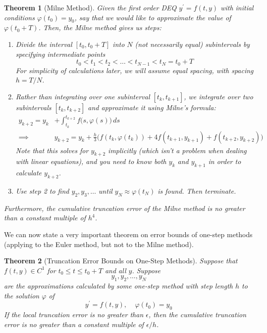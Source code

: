 \documentclass{article}
\newtheorem{theorem}{Theorem}[section]
\theoremstyle{remark}
\theoremstyle{definition}
\begin{document}
\begin{theorem}[Milne Method]
Given the first order DEQ $y^\prime = f(t, y)$ with initial conditions $\varphi(t_0) = y_0$, say that we would like to approximate the value of $\varphi(t_0 + T)$. Then, the \textit{Milne method} gives us steps: 
\begin{enumerate}
    \item Divide the interval $[t_0, t_0 + T]$ into $N$ (not necessarily equal) subintervals by specifying intermediate points 
    \[t_0 < t_1 < t_2 < \ldots < t_{N-1} < t_N = t_0 + T\]
    For simplicity of calculations later, we will assume equal spacing, with spacing $h = T/N$. 
    \item Rather than integrating over one subinterval $[t_k, t_{k+1}]$, we integrate over two subintervals $[t_k, t_{k+2}]$ and approximate it using Milne's formula:
    \begin{align*}
        y_{k+2} = y_k & + \int_{t_k}^{t_{k+2}} f\big(s, \varphi(s)\big)\,ds \\
        \implies & y_{k+2} = y_k + \frac{h}{3} \big( f(t_k, \varphi(t_k)) + 4 f (t_{k+1}, y_{k+1}) + f(t_{k+2}, y_{k+2})\big)
    \end{align*}
    Note that this solves for $y_{k+2}$ implicitly (which isn't a problem when dealing with linear equations), and you need to know both $y_k$ and $y_{k+1}$ in order to calculate $y_{k+2}$. 
    \item Use step 2 to find $y_2, y_3, \ldots$ until $y_N \approx \varphi(t_N)$ is found. Then terminate. 
\end{enumerate}
Furthermore, the cumulative truncation error of the Milne method is no greater than a constant multiple of $h^4$. 
\end{theorem}

We can now state a very important theorem on error bounds of one-step methods (applying to the Euler method, but not to the Milne method). 

\begin{theorem}[Truncation Error Bounds on One-Step Methods]
Suppose that $f(t, y) \in C^1$ for $t_0 \leq t \leq t_0 + T$ and all $y$. Suppose 
\[y_1, y_2, \ldots, y_N\]
are the approximations calculated by some one-step method with step length $h$ to the solution $\varphi$ of 
\[y^\prime = f(t, y), \;\;\;\; \varphi(t_0) = y_0\]
If the local truncation error is no greater than $\epsilon$, then the cumulative truncation error is no greater than a constant multiple of $\epsilon/h$. 
\end{theorem}
\end{document}
